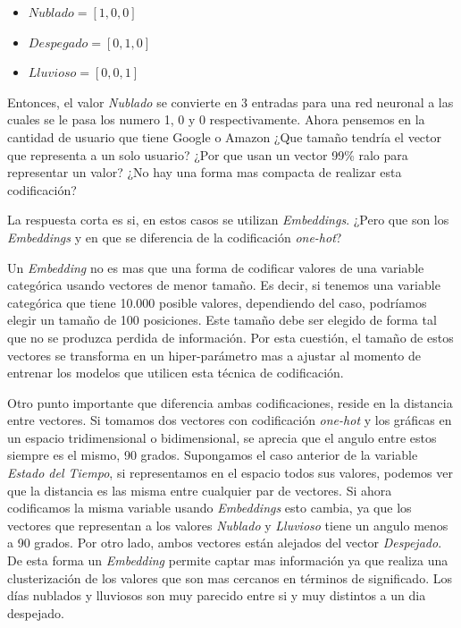 \documentclass[11pt,a4paper,twoside]{thesis}
\begin{document}
\begin{itemize}
	\item $Nublado    = [1, 0, 0]$
	\item $Despegado  = [0, 1, 0]$
	\item $Lluvioso   = [0, 0, 1]$
\end{itemize}

Entonces, el valor \textit{Nublado} se convierte en 3 entradas para una red neuronal a las cuales se le pasa los numero 1, 0 y 0 respectivamente. Ahora pensemos en la cantidad de usuario que tiene Google o Amazon ¿Que tamaño tendría el vector que representa a un solo usuario? ¿Por que usan un vector 99\% ralo para representar un valor? ¿No hay una forma mas compacta de realizar esta codificación? 

La respuesta corta es si, en estos casos se utilizan \textit{Embeddings}. ¿Pero que son los \textit{Embeddings} y en que se diferencia de la codificación \textit{one-hot}?

Un \textit{Embedding} no es mas que una forma de codificar valores de una variable categórica usando vectores de menor tamaño. Es decir, si tenemos una variable categórica
que tiene 10.000 posible valores, dependiendo del caso, podríamos elegir un tamaño de 100 posiciones. Este tamaño debe ser elegido de forma tal que no se produzca
perdida de información. Por esta cuestión, el tamaño de estos vectores se transforma en un hiper-parámetro mas a ajustar al momento de entrenar los modelos que utilicen esta técnica de codificación.

Otro punto importante que diferencia ambas codificaciones, reside en la distancia entre vectores. Si tomamos dos vectores con codificación \textit{one-hot} y los gráficas en un espacio tridimensional o bidimensional, se aprecia que el angulo entre estos siempre es el mismo, 90 grados. Supongamos el caso anterior de la variable \textit{Estado del Tiempo}, si representamos en el espacio todos sus valores, podemos ver que la distancia es las misma entre cualquier par de vectores.
Si ahora codificamos la misma variable usando \textit{Embeddings} esto cambia, ya que los vectores que representan a los valores \textit{Nublado} y \textit{Lluvioso} tiene un angulo menos a 90 grados. Por otro lado, ambos vectores están alejados del vector \textit{Despejado}. De esta forma un \textit{Embedding} permite captar mas información ya que realiza una clusterización de los valores que son mas cercanos en términos de significado. Los días nublados y lluviosos son muy parecido entre si y muy distintos a un dia despejado.
\end{document}
